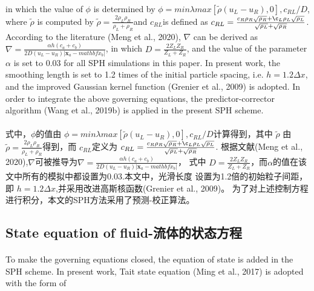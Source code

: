 \documentclass[UTF8]{ctexart}
\begin{document}
{{\paragraph{\quad}in which the value of $\phi$ is determined by $\phi = min{λmax[\tilde{ρ}(u_L-u_R), 0], c_{RL}/D}$, 
                 where $\tilde{\rho}$ is computed by $\tilde{ρ} = \frac{2 \rho_L \rho_R}{\rho_L + \rho_R} $and $c_{RL}$is defined as
                 $c_{RL} = \frac{c_R \rho_R \sqrt{\rho_R} + \c_L \rho_L \sqrt{\rho_L}}{\sqrt{\rho_L}+\sqrt{\rho_R}}$.
                 According to the literature (Meng et al., 2020), 
                 $\nabla$ can be derived as $\nabla =\frac{ \alpha h (c_a+c_b) }{2D(u_L-u_R)|\mathbf{x}_a-mathbf{x}_b|}$, 
                 in which $D = \frac{2Z_L Z_R}{Z_L + Z_R}$, and the value of the parameter $\alpha$ 
                 is set to 0.03 for all SPH simulations in this paper. 
                 In present work, the smoothing length is set to 1.2 times of the initial particle 
                 spacing, i.e. $h = 1.2 \Delta x$, and the improved Gaussian kernel function (Grenier et al., 2009) 
                 is adopted. In order to integrate the above governing equations, the predictor-corrector 
                 algorithm (Wang et al., 2019b) is applied in the present SPH scheme.
\paragraph{\quad}式中，$\phi$的值由 $\phi = min{λmax[\tilde{ρ}(u_L-u_R), 0], c_{RL}/D}$计算得到，其中 $\tilde{\rho}$
                由 $\tilde{ρ} = \frac{2 \rho_L \rho_R}{\rho_L + \rho_R} $得到，而 $c_{RL}$定义为
                $c_{RL} = \frac{c_R \rho_R \sqrt{\rho_R} + \c_L \rho_L \sqrt{\rho_L}}{\sqrt{\rho_L}+\sqrt{\rho_R}}$.
                根据文献(Meng et al., 2020),$\nabla$可被推导为$\nabla =\frac{ \alpha h (c_a+c_b) }{2D(u_L-u_R)|\mathbf{x}_a-mathbf{x}_b|}$，
                式中 $D = \frac{2Z_L Z_R}{Z_L + Z_R}$，而$\alpha$的值在该文中所有的模拟中都设置为0.03.本文中，光滑长度
                设置为1.2倍的初始粒子间距，即 $h = 1.2 \Delta x$,并采用改进高斯核函数(Grenier et al., 2009)。
                为了对上述控制方程进行积分，本文的SPH方法采用了预测-校正算法。


\subsection{State equation of fluid-流体的状态方程}
\paragraph{\quad}To make the governing equations closed, the equation of state is added
                in the SPH scheme. In present work, Tait state equation (Ming et al., 2017) 
                is adopted with the form of
}}
\end{document}
